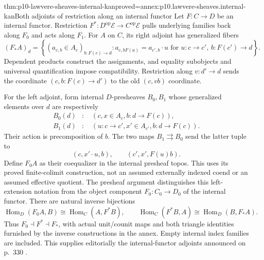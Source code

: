 \begin{hbtheorem}{thm:p10-lawvere-sheaves-internal-kan}{proved=annex:p10.lawvere-sheaves.internal-kan}{Both adjoints of restriction along an internal functor}
Let \(F:C\to D\) be an internal functor.  Restriction
\(F^*:D^{\mathrm{op}}\mathcal E\to C^{\mathrm{op}}\mathcal E\)
pulls underlying families back along \(F_0\) and acts along
\(F_1\).  For \(A\) on \(C\), its right adjoint has
generalized fibers
\[
 (F_*A)_d=
 \left\{(a_{c,b}\in A_c)_{b:F(c)\to d}:
 a_{c,bF(u)}=a_{c',b}\cdot u
            \text{ for }u:c\to c',\ b:F(c')\to d\right\}.
\]
Dependent products construct the assignments, and equality
subobjects and universal quantification impose compatibility.
Restriction along \(v:d'\to d\) sends the coordinate
\((c,b:F(c)\to d')\) to the old \((c,vb)\) coordinate.

For the left adjoint, form internal \(D\)-presheaves \(B_0,B_1\)
whose generalized elements over \(d\) are respectively
\[
\begin{aligned}
 B_0(d)&:\quad(c,x\in A_c,b:d\to F(c)),\\
 B_1(d)&:\quad(u:c\to c',x'\in A_{c'},b:d\to F(c)).
\end{aligned}
\]
Their action is precomposition of \(b\).  The two maps
\(B_1\rightrightarrows B_0\) send the latter tuple to
\[
              (c,x'\cdot u,b),\qquad(c',x',F(u)b).
\]
Define \(F_0A\) as their coequalizer in the internal presheaf
topos.  This uses its proved finite-colimit construction, not an
assumed externally indexed coend or an assumed effective quotient.
The presheaf argument distinguishes this left-extension notation
from the object component \(F_0:C_0\to D_0\) of the internal
functor.
There are natural inverse bijections
\[
 \operatorname{Hom}_D(F_0A,B)\cong\operatorname{Hom}_C(A,F^*B),
 \qquad
 \operatorname{Hom}_C(F^*B,A)\cong\operatorname{Hom}_D(B,F_*A).
\]
Thus \(F_0\dashv F^*\dashv F_*\), with actual unit/counit
maps and both triangle identities furnished by the inverse
constructions in the annex.  Empty internal index families are
included.  This supplies editorially the internal-functor adjoints
announced on p.~330 \cite[p.~330]{Lawvere1970}.
\end{hbtheorem}

